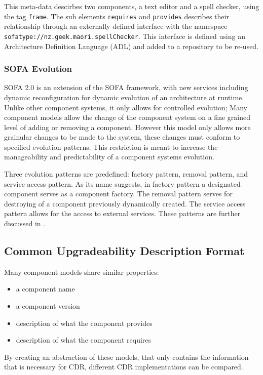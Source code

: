 This meta-data descirbes two components, a text editor and a spell checker, using the tag \verb+frame+.
The sub elements \verb+requires+ and \verb+provides+ describes their relationship through an externally defined interface with the namespace \verb+sofatype://nz.geek.maori.spellChecker+.
This interface is defined using an Architecture Definition Language (ADL) and added to a repository to be re-used. 


\subsubsection{SOFA Evolution}
SOFA 2.0 is an extension of the SOFA framework, with new services including dynamic reconfiguration for dynamic evolution of an architecture at runtime. 
Unlike other component systems,
it only allows for controlled evolution; 
Many component models allow the change of the component system on a fine grained level of adding or removing a component.
However this model only allows more grainular changes to be made to the system, these changes must conform to specified evolution patterns.
This restriction is meant to increase the manageability and predictability of a component systems evolution. 

Three evolution patterns are predefined: factory pattern, removal pattern, and service access pattern.
As its name suggests, in factory pattern a designated component serves as a component factory. 
The removal pattern serves for destroying of a component previously dynamically created.
The service access pattern allows for the access to external services.
These patterns are further discussed in \cite{Hnetynka2006}.


\subsection{Common Upgradeability Description Format}
Many component models share similar properties:
\begin{itemize}
  \item a component name
  \item a component version
  \item description of what the component provides
  \item description of what the component requires
\end{itemize} 

By creating an abstraction of these models, that only contains the information that is necessary for CDR, different CDR implementations can be compared.

